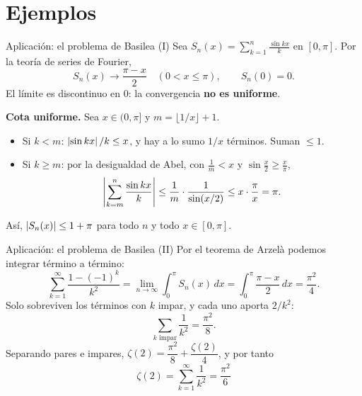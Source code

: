 \section{Ejemplos}


\begin{frame}{Aplicación: el problema de Basilea (I)}
    Sea $S_n(x)=\displaystyle\sum_{k=1}^n\frac{\sin kx}{k}$ en $[0,\pi]$. Por la teoría de series de Fourier,
    \[
        S_n(x)\to\frac{\pi-x}{2}\quad(0<x\le\pi),\qquad S_n(0)=0.
    \]
    El límite es discontinuo en $0$: la convergencia \textbf{no es uniforme}.

    \vspace{0.15cm}
    \textbf{Cota uniforme.} Sea $x\in(0,\pi]$ y $m=\lfloor1/x\rfloor+1$.
    \begin{itemize}
        \small
        \item Si $k<m$: $\left\lvert \sin kx \right\rvert/k\le x$, y hay a lo sumo $1/x$ términos. Suman $\le1$.
        \item Si $k\ge m$: por la desigualdad de Abel, con $\frac1m<x$ y $\sin\frac{x}{2}\ge\frac{x}{\pi}$,
        \[
            \left\lvert \sum_{k=m}^n\frac{\sin kx}{k} \right\rvert\le\frac1m\cdot\frac{1}{\sin(x/2)}\le x\cdot\frac{\pi}{x}=\pi.
        \]
    \end{itemize}
    Así, $\left\lvert S_n(x) \right\rvert\le1+\pi$ para todo $n$ y todo $x\in[0,\pi]$.
\end{frame}

\begin{frame}{Aplicación: el problema de Basilea (II)}
    Por el teorema de Arzelà podemos integrar término a término:
    \[
        \sum_{k=1}^\infty\frac{1-(-1)^k}{k^2}
        =\lim_{n\to\infty}\int_0^\pi S_n(x)\,dx
        =\int_0^\pi\frac{\pi-x}{2}\,dx=\frac{\pi^2}{4}.
    \]
    Solo sobreviven los términos con $k$ impar, y cada uno aporta $2/k^2$:
    \[
        \sum_{k\text{ impar}}\frac{1}{k^2}=\frac{\pi^2}{8}.
    \]
    Separando pares e impares, $\zeta(2)=\dfrac{\pi^2}{8}+\dfrac{\zeta(2)}{4}$, y por tanto
    \[
        \boxed{\ \zeta(2)=\sum_{k=1}^\infty\frac{1}{k^2}=\frac{\pi^2}{6}\ }
    \]
\end{frame}

